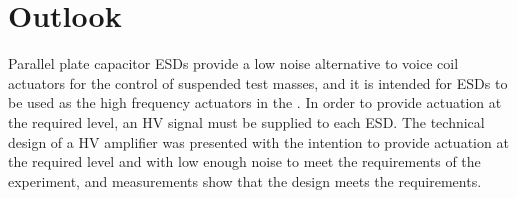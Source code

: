 % 

\section{Outlook}
Parallel plate capacitor \glspl{ESD} provide a low noise alternative to voice coil actuators for the control of suspended test masses, and it is intended for \glspl{ESD} to be used as the high frequency actuators in the \SSMEXPT{}. In order to provide actuation at the required level, an \gls{HV} signal must be supplied to each \gls{ESD}. The technical design of a \gls{HV} amplifier was presented with the intention to provide actuation at the required level and with low enough noise to meet the requirements of the experiment, and measurements show that the design meets the requirements.